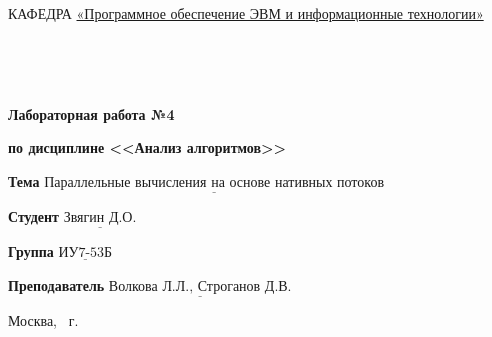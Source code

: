 \begin{titlepage}
\noindent КАФЕДРА \underline{«Программное обеспечение ЭВМ и информационные технологии»}

\

\

\begin{center}
\noindent\begin{minipage}{1.0\textwidth}\centering
\Large\textbf{Лабораторная работа №4}

\textbf{по дисциплине <<Анализ алгоритмов>>}

\end{minipage}
\end{center}
\noindent\textbf{Тема} $\underline{\text{Параллельные вычисления на основе нативных потоков}}$

\noindent\textbf{Студент} $\underline{\text{Звягин Д.О.}}$

\noindent\textbf{Группа} $\underline{\text{ИУ7-53Б}}$

\noindent\textbf{Преподаватель} $\underline{\text{Волкова Л.Л., Строганов Д.В.}}$

\begin{center}
\mbox{}
\vfill
Москва, \the\year~г.
\end{center}
\clearpage
\end{titlepage}